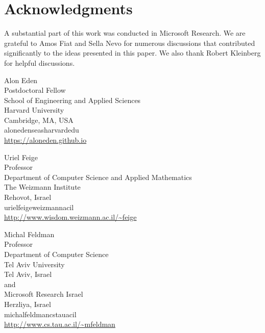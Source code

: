 \documentclass{toc}
\theoremstyle{plain}
\begin{document}
\section*{Acknowledgments}

	A substantial part of this work was conducted in Microsoft Research. We are grateful to Amos Fiat and Sella Nevo for numerous discussions that contributed significantly to the ideas presented in this paper. We also thank Robert Kleinberg for helpful discussions.

\nocite{conf-version}


%
%
%
%


%
%
%
%
%
\begin{tocauthors}
\begin{tocinfo}[eden]
 Alon Eden\\
 Postdoctoral Fellow\\
 School of Engineering and Applied Sciences\\
 Harvard University\\
 Cambridge, MA, USA\\
 aloneden\tocat{}seas\tocdot{}harvard\tocdot{}edu \\   %
 \url{https://aloneden.github.io}      %
\end{tocinfo}
\begin{tocinfo}[feige]
  Uriel Feige\\
  Professor\\
  Department of Computer Science and Applied Mathematics\\
  The Weizmann Institute\\
  Rehovot, Israel\\
  uriel\tocdot{}feige\tocat{}weizmann\tocdot{}ac\tocdot{}il \\
  \url{http://www.wisdom.weizmann.ac.il/~feige}
\end{tocinfo}
\begin{tocinfo}[feldman]
Michal Feldman\\
Professor\\
Department of Computer Science\\
Tel Aviv University\\
Tel Aviv, Israel\\
and\\
Microsoft Research Israel\\
Herzliya, Israel\\
michal\tocdot{}feldman\tocat{}cs\tocdot{}tau\tocdot{}ac\tocdot{}il \\
\url{http://www.cs.tau.ac.il/~mfeldman}
\end{tocinfo}
\end{tocauthors}
\end{document}
